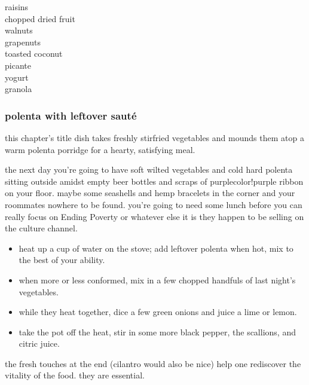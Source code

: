 \mbox{\hskip 1cm}\textsf{raisins}\\
\mbox{\hskip 2.5cm}\textsf{chopped dried fruit}\\
\mbox{\hskip 6cm}\textsf{walnuts}\\
\mbox{\hskip 1.5cm}\textsf{grapenuts}\\
\mbox{\hskip 3.5cm}\textsf{toasted coconut}\\
\mbox{\hskip 7cm}\textsf{picante}\\
\mbox{\hskip 2cm}\textsf{yogurt}\\
\mbox{\hskip 4.5cm}\textsf{granola}

\subsubsection{polenta with leftover saut\'{e}}

this chapter's title dish takes freshly stirfried vegetables and mounds 
them atop a warm polenta porridge for a hearty, satisfying meal.

the next day you're going to have soft wilted vegetables and cold hard 
polenta sitting outside amidst empty beer bottles and scraps of purple{color!purple} 
ribbon on your floor. maybe some seashells and hemp bracelets in the corner 
and your roommates nowhere to be found. you're going to need some lunch 
before you can really focus on Ending Poverty or whatever else it is they 
happen to be selling on the culture channel.

\begin{itemize}

  \item heat up a cup of water on the stove; add leftover polenta when hot, 
  mix to the best of your ability.

  \item when more or less conformed, mix in a few chopped handfuls of last 
  night's vegetables.

  \item while they heat together, dice a few green onions and juice a lime or 
  lemon.

  \item take the pot off the heat, stir in some more black pepper, the 
  scallions, and citric juice.

\end{itemize}

the fresh touches at the end (cilantro would also be nice) help one rediscover 
the vitality of the food. they are essential. 	

